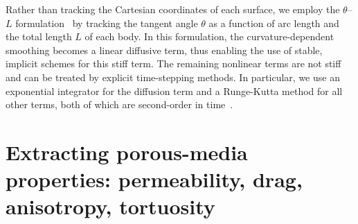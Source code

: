 \documentclass[3p]{elsarticle}
\newcommand{\nn}{{\mathbf{n}}}
\newcommand{\abs}[1]{\left| #1 \right|}
\newcommand{\Vn}{V_\nn}
\newcommand{\CE}{C_E}
\newcommand{\thL}{$\theta$--$L$}
\begin{document}
Rather than tracking the Cartesian coordinates of each surface, we employ the {\thL} formulation~\cite{hou-low-she1994, Moore2013, MooreCPAM2017, mac2022morphological} by tracking the tangent angle $\theta$ as a function of arc length and the total length $L$ of each body. In this formulation, the curvature-dependent smoothing becomes a linear diffusive term, thus enabling the use of stable, implicit schemes for this stiff term. The remaining nonlinear terms are not stiff and can be treated by explicit time-stepping methods. In particular, we use an exponential integrator for the diffusion term and a Runge-Kutta method for all other terms, both of which are second-order in time~\cite{quaife2018boundary}.





\section{Extracting porous-media properties: permeability, drag, anisotropy, tortuosity}
\label{sec:medium}
\end{document}
